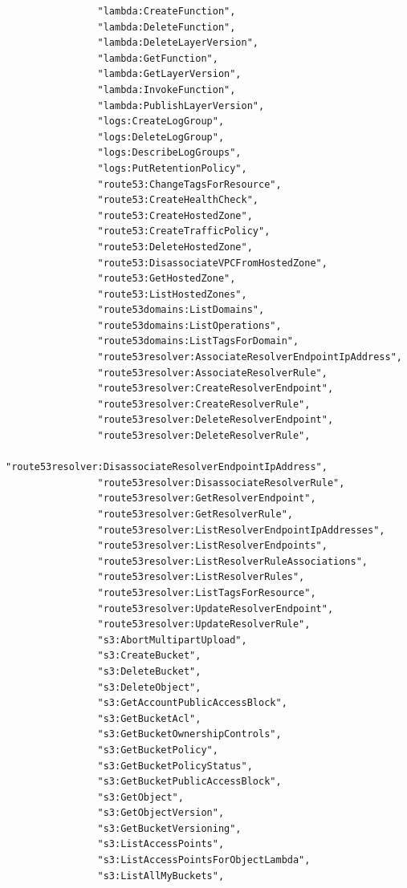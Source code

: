 \begin{verbatim}
                "lambda:CreateFunction",
                "lambda:DeleteFunction",
                "lambda:DeleteLayerVersion",
                "lambda:GetFunction",
                "lambda:GetLayerVersion",
                "lambda:InvokeFunction",
                "lambda:PublishLayerVersion",
                "logs:CreateLogGroup",
                "logs:DeleteLogGroup",
                "logs:DescribeLogGroups",
                "logs:PutRetentionPolicy",
                "route53:ChangeTagsForResource",
                "route53:CreateHealthCheck",
                "route53:CreateHostedZone",
                "route53:CreateTrafficPolicy",
                "route53:DeleteHostedZone",
                "route53:DisassociateVPCFromHostedZone",
                "route53:GetHostedZone",
                "route53:ListHostedZones",
                "route53domains:ListDomains",
                "route53domains:ListOperations",
                "route53domains:ListTagsForDomain",
                "route53resolver:AssociateResolverEndpointIpAddress",
                "route53resolver:AssociateResolverRule",
                "route53resolver:CreateResolverEndpoint",
                "route53resolver:CreateResolverRule",
                "route53resolver:DeleteResolverEndpoint",
                "route53resolver:DeleteResolverRule",
                "route53resolver:DisassociateResolverEndpointIpAddress",
                "route53resolver:DisassociateResolverRule",
                "route53resolver:GetResolverEndpoint",
                "route53resolver:GetResolverRule",
                "route53resolver:ListResolverEndpointIpAddresses",
                "route53resolver:ListResolverEndpoints",
                "route53resolver:ListResolverRuleAssociations",
                "route53resolver:ListResolverRules",
                "route53resolver:ListTagsForResource",
                "route53resolver:UpdateResolverEndpoint",
                "route53resolver:UpdateResolverRule",
                "s3:AbortMultipartUpload",
                "s3:CreateBucket",
                "s3:DeleteBucket",
                "s3:DeleteObject",
                "s3:GetAccountPublicAccessBlock",
                "s3:GetBucketAcl",
                "s3:GetBucketOwnershipControls",
                "s3:GetBucketPolicy",
                "s3:GetBucketPolicyStatus",
                "s3:GetBucketPublicAccessBlock",
                "s3:GetObject",
                "s3:GetObjectVersion",
                "s3:GetBucketVersioning",
                "s3:ListAccessPoints",
                "s3:ListAccessPointsForObjectLambda",
                "s3:ListAllMyBuckets",

\end{verbatim}
